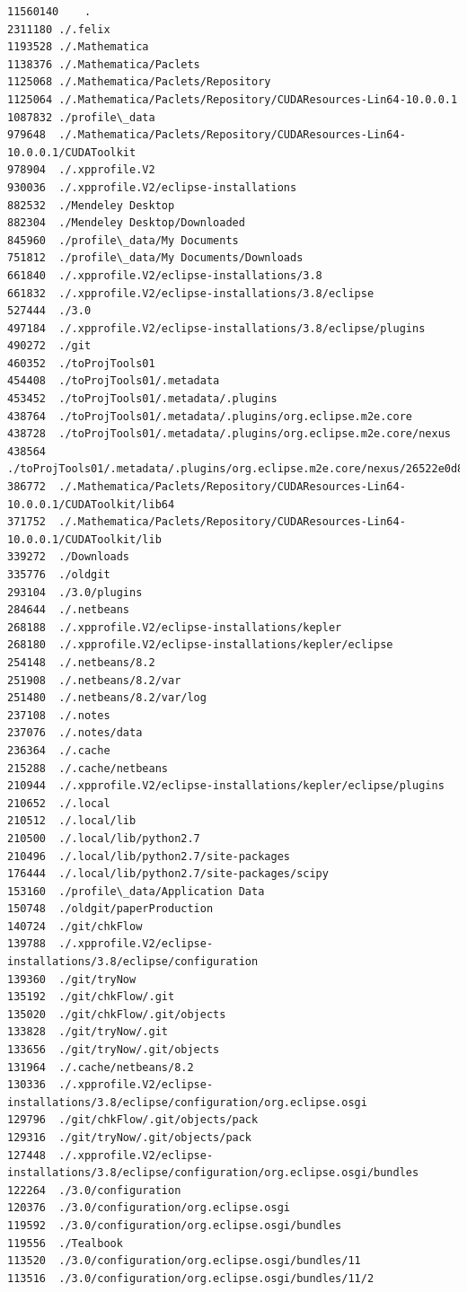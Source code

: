 \documentclass[hyperref]{labbook}
\begin{document}
\begin{verbatim}
11560140	.
2311180	./.felix
1193528	./.Mathematica
1138376	./.Mathematica/Paclets
1125068	./.Mathematica/Paclets/Repository
1125064	./.Mathematica/Paclets/Repository/CUDAResources-Lin64-10.0.0.1
1087832	./profile\_data
979648	./.Mathematica/Paclets/Repository/CUDAResources-Lin64-10.0.0.1/CUDAToolkit
978904	./.xpprofile.V2
930036	./.xpprofile.V2/eclipse-installations
882532	./Mendeley Desktop
882304	./Mendeley Desktop/Downloaded
845960	./profile\_data/My Documents
751812	./profile\_data/My Documents/Downloads
661840	./.xpprofile.V2/eclipse-installations/3.8
661832	./.xpprofile.V2/eclipse-installations/3.8/eclipse
527444	./3.0
497184	./.xpprofile.V2/eclipse-installations/3.8/eclipse/plugins
490272	./git
460352	./toProjTools01
454408	./toProjTools01/.metadata
453452	./toProjTools01/.metadata/.plugins
438764	./toProjTools01/.metadata/.plugins/org.eclipse.m2e.core
438728	./toProjTools01/.metadata/.plugins/org.eclipse.m2e.core/nexus
438564	./toProjTools01/.metadata/.plugins/org.eclipse.m2e.core/nexus/26522e0d83a422eed93329ece7565cfc
386772	./.Mathematica/Paclets/Repository/CUDAResources-Lin64-10.0.0.1/CUDAToolkit/lib64
371752	./.Mathematica/Paclets/Repository/CUDAResources-Lin64-10.0.0.1/CUDAToolkit/lib
339272	./Downloads
335776	./oldgit
293104	./3.0/plugins
284644	./.netbeans
268188	./.xpprofile.V2/eclipse-installations/kepler
268180	./.xpprofile.V2/eclipse-installations/kepler/eclipse
254148	./.netbeans/8.2
251908	./.netbeans/8.2/var
251480	./.netbeans/8.2/var/log
237108	./.notes
237076	./.notes/data
236364	./.cache
215288	./.cache/netbeans
210944	./.xpprofile.V2/eclipse-installations/kepler/eclipse/plugins
210652	./.local
210512	./.local/lib
210500	./.local/lib/python2.7
210496	./.local/lib/python2.7/site-packages
176444	./.local/lib/python2.7/site-packages/scipy
153160	./profile\_data/Application Data
150748	./oldgit/paperProduction
140724	./git/chkFlow
139788	./.xpprofile.V2/eclipse-installations/3.8/eclipse/configuration
139360	./git/tryNow
135192	./git/chkFlow/.git
135020	./git/chkFlow/.git/objects
133828	./git/tryNow/.git
133656	./git/tryNow/.git/objects
131964	./.cache/netbeans/8.2
130336	./.xpprofile.V2/eclipse-installations/3.8/eclipse/configuration/org.eclipse.osgi
129796	./git/chkFlow/.git/objects/pack
129316	./git/tryNow/.git/objects/pack
127448	./.xpprofile.V2/eclipse-installations/3.8/eclipse/configuration/org.eclipse.osgi/bundles
122264	./3.0/configuration
120376	./3.0/configuration/org.eclipse.osgi
119592	./3.0/configuration/org.eclipse.osgi/bundles
119556	./Tealbook
113520	./3.0/configuration/org.eclipse.osgi/bundles/11
113516	./3.0/configuration/org.eclipse.osgi/bundles/11/2

\end{verbatim}
\end{document}

